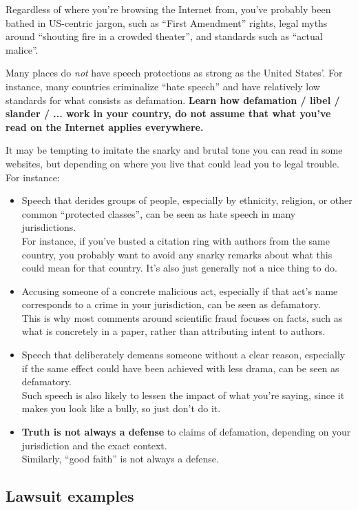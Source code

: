 \documentclass[letterpaper, 12pt]{article}
\begin{document}
Regardless of where you're browsing the Internet from, you've probably been bathed in US-centric jargon, such as ``First Amendment'' rights, legal myths around ``shouting fire in a crowded theater'', and standards such as ``actual malice''.

Many places do \emph{not} have speech protections as strong as the United States'. For instance, many countries criminalize ``hate speech'' and have relatively low standards for what consists as defamation. \textbf{Learn how defamation / libel / slander / ... work in your country, do not assume that what you've read on the Internet applies everywhere.}

It may be tempting to imitate the snarky and brutal tone you can read in some websites, but depending on where you live that could lead you to legal trouble. For instance:
\begin{itemize}
    \item Speech that derides groups of people, especially by ethnicity, religion, or other common ``protected classes'', can be seen as hate speech in many jurisdictions. \\
    For instance, if you've busted a citation ring with authors from the same country, you probably want to avoid any snarky remarks about what this could mean for that country. It's also just generally not a nice thing to do.
    \item Accusing someone of a concrete malicious act, especially if that act's name corresponds to a crime in your jurisdiction, can be seen as defamatory. \\
    This is why most comments around scientific fraud focuses on facts, such as what is concretely in a paper, rather than attributing intent to authors.
    \item Speech that deliberately demeans someone without a clear reason, especially if the same effect could have been achieved with less drama, can be seen as defamatory. \\
    Such speech is also likely to lessen the impact of what you're saying, since it makes you look like a bully, so just don't do it.
    \item \textbf{Truth is not always a defense} to claims of defamation, depending on your jurisdiction and the exact context. \\
    Similarly, ``good faith'' is not always a defense.
\end{itemize}

\subsection*{Lawsuit examples}
\end{document}
